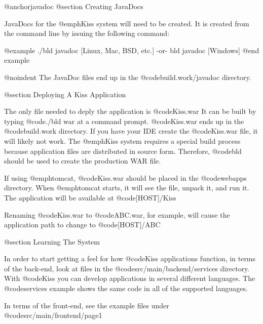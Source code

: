 @anchor{javadoc} @section Creating JavaDocs

JavaDocs for the @emph{Kiss} system will need to be created.  It is
created from the command line by issuing the following command:

@example
./bld javadoc              [Linux, Mac, BSD, etc.]
    -or-
bld javadoc                [Windows]
@end example

@noindent
The JavaDoc files end up in the @code{build.work/javadoc} directory.


@section Deploying A Kiss Application

The only file needed to deply the application is @code{Kiss.war} It
can be built by typing @code{./bld war} at a command prompt.
@code{Kiss.war} ends up in the @code{build.work} directory.  If you
have your IDE create the @code{Kiss.war} file, it will likely not
work.  The @emph{Kiss} system requires a special build process because
application files are distributed in source form.  Therefore, @code{bld}
should be used to create the production WAR file.

If using @emph{tomcat}, @code{Kiss.war} should be placed in the
@code{webapps} directory.  When @emph{tomcat} starts, it will see the
file, unpack it, and run it.  The application will be available at
@code{[HOST]/Kiss}

Renaming @code{Kiss.war} to @code{ABC.war}, for example, will cause
the application path to change to @code{[HOST]/ABC}

@section Learning The System

In order to start getting a feel for how @code{Kiss} applications
function, in terms of the back-end, look at files in the
@code{src/main/backend/services} directory.  With @code{Kiss} you can
develop applications in several different languages.  The @code{services}
example shows the same code in all of the supported languages.

In terms of the front-end, see the example files under @code{src/main/frontend/page1}
